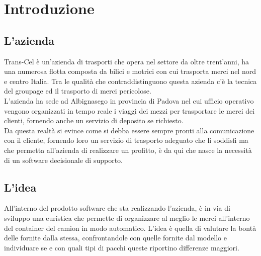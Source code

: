 
\chapter{Introduzione}
\section{L'azienda}
Trans-Cel è un'azienda di trasporti che opera nel settore da oltre trent'anni, ha una numerosa flotta composta da bilici e motrici con cui trasporta merci nel nord e centro Italia.
Tra le qualità che contraddistinguono questa azienda c'è la tecnica del groupage ed il trasporto di merci pericolose.\\
L'azienda ha sede ad Albignasego in provincia di Padova nel cui ufficio operativo vengono organizzati in tempo reale i viaggi dei mezzi per trasportare le merci dei clienti, fornendo anche un servizio di deposito se richiesto.\\
Da questa realtà si evince come si debba essere sempre pronti alla comunicazione con il cliente, fornendo loro un servizio di trasporto adeguato che li soddisfi ma che permetta all'azienda di realizzare un profitto, è da qui che nasce la necessità di un software decisionale di supporto.
\newpage
\section{L'idea}
All'interno del prodotto software che sta realizzando l'azienda, è in via di sviluppo una euristica che permette di organizzare al meglio le merci all'interno del container del camion in modo automatico. L'idea è quella di valutare la bontà delle  fornite dalla stessa, confrontandole con quelle fornite dal modello e individuare se e con quali tipi di pacchi queste riportino differenze maggiori.

